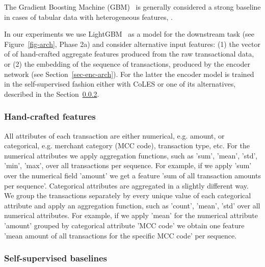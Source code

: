 \documentclass[sigconf]{acmart}
\newcommand{\revised}[1]{#1}
\begin{document}
The Gradient Boosting Machine (GBM)~\citep{Friedman2001GreedyFA} is generally considered a strong
baseline in cases of tabular data with heterogeneous features,%
\citep{Wu2009AdaptingBF,Vorobev2019LearningTS,Zhang2015AGB,Niu2019ACS}.
%
\revised{
In our experiments we use LightGBM~\citep{Ke2017LightGBMAH} as a model for the downstream task
(see Figure~\ref{fig-arch}, Phase 2a) and consider alternative input features:
(1) the vector of of hand-crafted aggregate features produced from the raw transactional data, or
(2) the embedding of the sequence of transactions, produced by the encoder network (see Section~\ref{sec-enc-arch}).
For the latter the encoder model is trained in the self-supervised fashion either with CoLES
or one of its alternatives, described in the Section~\ref{sec-ss-base}.
}

\subsubsection{Hand-crafted features} \label{sec-hand-features}
All attributes of each transaction are either numerical, e.g. amount, or categorical, e.g.
merchant category (MCC code), transaction type, etc.
% 
For the numerical attributes we apply aggregation functions, such as 'sum', 'mean', 'std',
'min', 'max', over all transactions per sequence. For example, if we apply 'sum' over the
numerical field 'amount' we get a feature 'sum of all transaction amounts per sequence'.
%
Categorical attributes are aggregated in a slightly different way. We group the transactions
separately by every unique value of each categorical attribute and apply an aggregation
function, such as 'count', 'mean', 'std' over all numerical attributes. For example, if
we apply 'mean' for the numerical attribute 'amount' grouped by categorical attribute
'MCC code' we obtain one feature 'mean amount of all transactions for the specific MCC
code' per sequence.

\subsubsection{Self-supervised baselines} \label{sec-ss-base}
\end{document}
